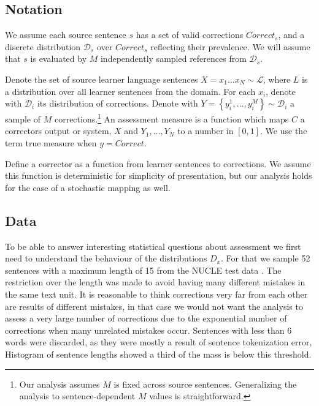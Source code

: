 		
		\subsection{Notation}
		
		We assume each source sentence $s$ has a set of valid corrections $Correct_s$,
		and a discrete distribution $\mathcal{D}_s$ over $Correct_s$ reflecting their prevalence.
		We will assume that $s$ is evaluated by
		$M$ independently sampled references from $\mathcal{D}_s$.
		
		Denote the set of source learner language sentences $X=x_{1}\ldots x_N \sim \mathcal{L}$, where
		$L$ is a distribution over all learner sentences from the domain. For each $x_i$, denote
		with $\mathcal{D}_{i}$ its distribution of corrections.
		Denote with $Y = \left\{y_{i}^{1},\ldots, y_{i}^{M}\right\} \sim \mathcal{D}_{i}$
		a sample of $M$ corrections.\footnote{Our analysis assumes $M$ is fixed across source sentences.
			Generalizing the analysis to sentence-dependent $M$ values is straightforward.}
		An assessment measure is a function which maps $C$ a correctors output or system, $X$ and $Y_1,\ldots,Y_N$ to
		a number in $[0,1]$. We use the term true measure when $y=Correct$.
		
		Define a corrector as a function from learner sentences to corrections.
		We assume this function is deterministic for simplicity of presentation,
		but our analysis holds for the case of a stochastic mapping as well.
		
		
		\subsection{Data}
		
		To be able to answer interesting statistical questions about assessment we first
		need to understand the behaviour of the distributions $D_x$. For that we sample
		52 sentences with a maximum length of 15 from the NUCLE test data
		. The restriction over the length was made to avoid having many different mistakes in the same text unit. It is reasonable to think corrections very far from each other are results of different mistakes, in that case we would not want the analysis to assess a very large number of corrections due to the exponential number of corrections when many unrelated mistakes occur.
		Sentences with less than 6 words were discarded, as they were mostly a result of sentence tokenization error,
		Histogram of sentence lengths showed a third of the mass is below this threshold.
		
